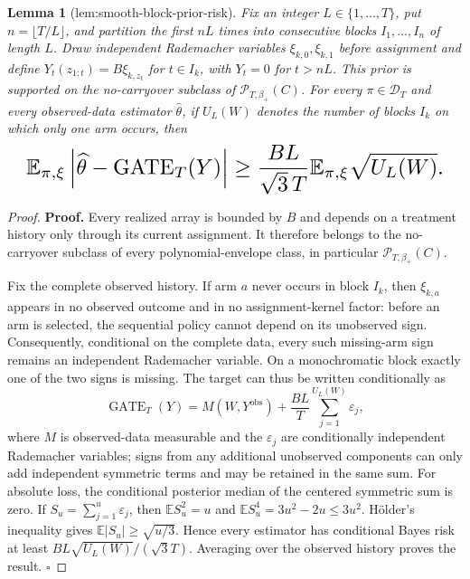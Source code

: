 \documentclass{article}
\newtheorem{lemma}{Lemma}
\begin{document}
\begin{lemma}[lem:smooth-block-prior-risk]\label{lem:smooth-block-prior-risk}
Fix an integer \(L\in\{1,\ldots,T\}\), put \(n=\lfloor T/L\rfloor\), and partition the first \(nL\) times into consecutive blocks \(I_1,\ldots,I_n\) of length \(L\). Draw independent Rademacher variables \(\xi_{k,0},\xi_{k,1}\) before assignment and define \(Y_t(z_{1:t})=B\xi_{k,z_t}\) for \(t\in I_k\), with \(Y_t=0\) for \(t>nL\). This prior is supported on the no-carryover subclass of \(\mathcal P_{T,\beta_+}(C)\). For every \(\pi\in\mathcal D_T\) and every observed-data estimator \(\widehat\theta\), if \(U_L(W)\) denotes the number of blocks \(I_k\) on which only one arm occurs, then \[
\makebox[\linewidth][c]{\resizebox{0.98\linewidth}{!}{\leavevmode\par\noindent \makebox[\linewidth][c]{\resizebox{0.98\linewidth}{!}{\(\displaystyle \displaystyle \mathbb E_{\pi,\xi}\left|\widehat\theta-\operatorname{GATE}_T(Y)\right|\ge\frac{BL}{\sqrt3\,T}\mathbb E_{\pi,\xi}\sqrt{U_L(W)}.\)}}\par\noindent}}
\]
\end{lemma}
\begin{proof}
\textbf{Proof.} Every realized array is bounded by \(B\) and depends on a treatment history only through its current assignment. It therefore belongs to the no-carryover subclass of every polynomial-envelope class, in particular \(\mathcal P_{T,\beta_+}(C)\).

Fix the complete observed history. If arm \(a\) never occurs in block \(I_k\), then \(\xi_{k,a}\) appears in no observed outcome and in no assignment-kernel factor: before an arm is selected, the sequential policy cannot depend on its unobserved sign. Consequently, conditional on the complete data, every such missing-arm sign remains an independent Rademacher variable. On a monochromatic block exactly one of the two signs is missing. The target can thus be written conditionally as \[\operatorname{GATE}_T(Y)=M(W,Y^{\mathrm{obs}})+\frac{BL}{T}\sum_{j=1}^{U_L(W)}\varepsilon_j,\] where \(M\) is observed-data measurable and the \(\varepsilon_j\) are conditionally independent Rademacher variables; signs from any additional unobserved components can only add independent symmetric terms and may be retained in the same sum. For absolute loss, the conditional posterior median of the centered symmetric sum is zero. If \(S_u=\sum_{j=1}^u\varepsilon_j\), then \(\mathbb E S_u^2=u\) and \(\mathbb E S_u^4=3u^2-2u\le3u^2\). Hölder's inequality gives \(\mathbb E|S_u|\ge\sqrt{u/3}\). Hence every estimator has conditional Bayes risk at least \(BL\sqrt{U_L(W)}/(\sqrt3 T)\). Averaging over the observed history proves the result. \(\square\)
\end{proof}
\end{document}
